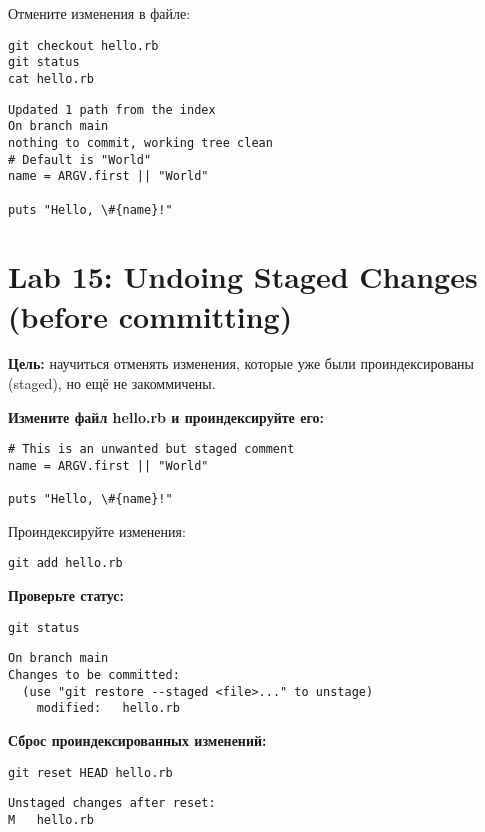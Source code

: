 \documentclass[a4paper,12pt]{report}
\begin{document}
Отмените изменения в файле:
\begin{verbatim}
git checkout hello.rb
git status
cat hello.rb
\end{verbatim}

\begin{verbatim}
Updated 1 path from the index
On branch main
nothing to commit, working tree clean
# Default is "World"
name = ARGV.first || "World"

puts "Hello, \#{name}!"
\end{verbatim}

\section{Lab 15: Undoing Staged Changes (before committing)}
\textbf{Цель:} научиться отменять изменения, которые уже были проиндексированы (staged), но ещё не закоммичены.

\textbf{Измените файл hello.rb и проиндексируйте его:}

\begin{verbatim}
# This is an unwanted but staged comment
name = ARGV.first || "World"

puts "Hello, \#{name}!"
\end{verbatim}

Проиндексируйте изменения:
\begin{verbatim}
git add hello.rb
\end{verbatim}

\textbf{Проверьте статус:}
\begin{verbatim}
git status
\end{verbatim}
\begin{verbatim}
On branch main
Changes to be committed:
  (use "git restore --staged <file>..." to unstage)
	modified:   hello.rb
\end{verbatim}


\textbf{Сброс проиндексированных изменений:}
\begin{verbatim}
git reset HEAD hello.rb
\end{verbatim}
\begin{verbatim}
Unstaged changes after reset:
M	hello.rb
\end{verbatim}

\end{document}
